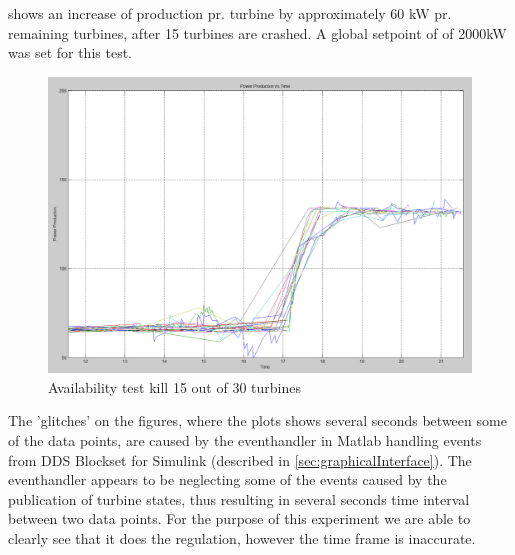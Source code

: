 \FloatBarrier
{} shows an increase of production pr. turbine by approximately 60 kW pr. remaining turbines, after 15 turbines are crashed. A global setpoint of of 2000kW was set for this test.

\begin{figure}[!h]
	\centering
	\includegraphics[width=\resultsFigureWidthScale\textwidth]{figures/Results/availabilitytest30-15_setpoint_2000.PNG}
	\caption{Availability test kill 15 out of 30 turbines}
	\label{fig:exp:availability_kill15}
\end{figure}

\FloatBarrier

The 'glitches' on the figures, where the plots shows several seconds between some of the data points, are caused by the eventhandler in Matlab handling events from DDS Blockset for Simulink (described in \cref{sec:graphicalInterface}). The eventhandler appears to be neglecting some of the events caused by the publication of turbine states, thus resulting in several seconds time interval between two data points. For the purpose of this experiment we are able to clearly see that it does the regulation, however the time frame is inaccurate.

